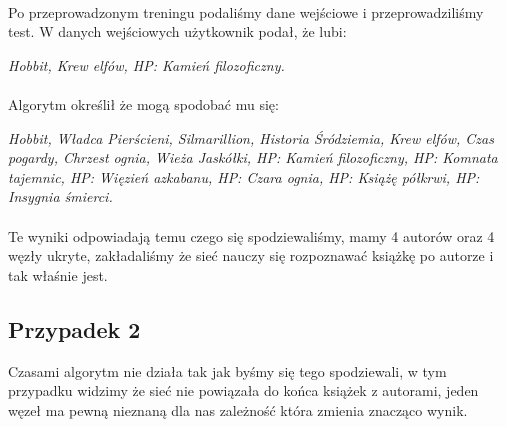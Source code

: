         \paragraph{}
            Po przeprowadzonym treningu podaliśmy dane wejściowe i przeprowadziliśmy test.
            W danych wejściowych użytkownik podał, że lubi:

            \textit{
                Hobbit, Krew elfów, HP: Kamień filozoficzny.
            }
        \paragraph{}
            Algorytm określił że mogą spodobać mu się:

            \textit{
                Hobbit, Władca Pierścieni, Silmarillion, Historia Śródziemia,
                Krew elfów, Czas pogardy, Chrzest ognia, Wieża Jaskółki, HP: Kamień filozoficzny,
                HP: Komnata tajemnic, HP: Więzień azkabanu, HP: Czara ognia, HP: Książę półkrwi,
                HP: Insygnia śmierci.
            }

        \paragraph{}
            Te wyniki odpowiadają temu czego się spodziewaliśmy, mamy 4 autorów oraz
            4 węzły ukryte, zakładaliśmy że sieć nauczy się rozpoznawać książkę po autorze i
            tak właśnie jest.

    \subsection{Przypadek 2}
        Czasami algorytm nie działa tak jak byśmy się tego spodziewali, w tym przypadku
        widzimy że sieć nie powiązała do końca książek z autorami, jeden węzeł ma pewną
        nieznaną dla nas zależność która zmienia znacząco wynik.

